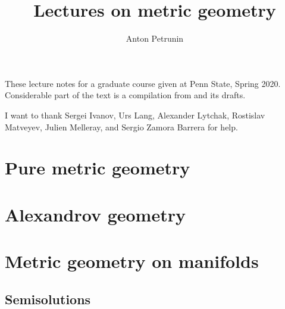 \documentclass[twoside]{book}
\begin{document}
 
\title{Lectures on metric geometry}
\author{Anton Petrunin}
\date{}
\maketitle

These lecture notes for a graduate course given at Penn State, Spring 2020.
Considerable part of the text is a compilation from \cite{alexander-kapovitch-petrunin-2019, alexander-kapovitch-petrunin-2025, petrunin-yashinski, petrunin-2022-PIGTIKAL, petrunin-zamorabarrera} and its drafts.

I want to thank 
Sergei Ivanov,
Urs Lang,
Alexander Lytchak,
Rostislav Matveyev,
Julien Melleray,
and Sergio Zamora Barrera for help.

\thispagestyle{empty}
\tableofcontents
\thispagestyle{empty}

%
\part{Pure metric geometry}




%


\part{Alexandrov geometry}







\part{Metric geometry on manifolds}


%
%
%

\backmatter

\chapter{Semisolutions}

{

\footnotesize
\begin{multicols}{2}







\end{multicols}
}

%
{\small\sloppy


\def\emph{\textit}

\printbibliography[heading=bibintoc]
\fussy
}
\end{document}
